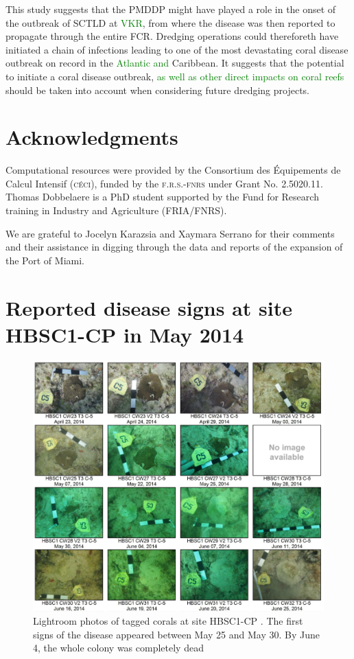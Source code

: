 \documentclass[preprint,12pt,authoryear]{elsarticle}
\newcommand{\modif}[1]{\textcolor{green}{#1}}
\begin{document}
This study suggests that the PMDDP might have played a role in the onset of the outbreak of SCTLD at \modif{VKR}, from where the disease was then reported to propagate through the entire FCR. Dredging operations could thereforeth have initiated a chain of infections leading to one of the most devastating coral disease outbreak on record in the \modif{Atlantic and} Caribbean. It suggests that the potential to initiate a coral disease outbreak, \modif{as well as other direct impacts on coral reefs} should be taken into account when considering future dredging projects.

\section*{Acknowledgments}
Computational resources were provided by the Consortium des \'Equipements de Calcul Intensif (\textsc{c\'eci}), funded by the \textsc{f.r.s.-fnrs} under Grant No. 2.5020.11. Thomas Dobbelaere is a PhD student supported by the Fund for Research training in Industry and Agriculture (\textsc{FRIA}/\textsc{FNRS}).

We are grateful to Jocelyn Karazsia and Xaymara Serrano for their comments and their assistance in digging through the data and reports of the expansion of the Port of Miami. 

 

\newpage
\appendix
\section{Reported disease signs at site HBSC1-CP in May 2014}\label{onset:appendice}
\begin{figure}[h!]
	\centering
	\includegraphics[width=\textwidth]{figures/hbsc1_cp.png}
	\caption{Lightroom photos of tagged corals at site HBSC1-CP \citep{dial2017}. The first signs of the disease appeared between May 25 and May 30. By June 4, the whole colony was completely dead}
\end{figure}
\newpage
\end{document}
